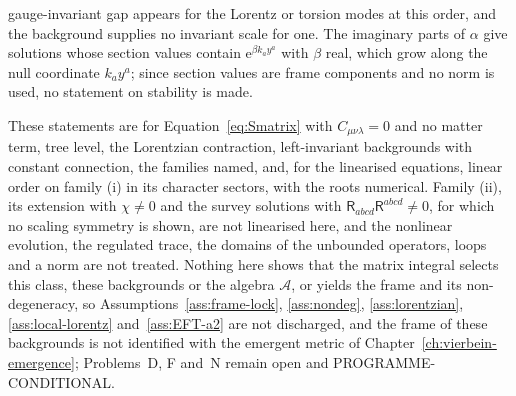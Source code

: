 gauge-invariant gap appears for the Lorentz or torsion modes at this order, and the background supplies no invariant scale for one. The imaginary parts of \(\alpha\) give solutions whose section values contain \(\mathrm e^{\beta k_ay^a}\) with \(\beta\) real, which grow along the null coordinate \(k_ay^a\); since section values are frame components and no norm is used, no statement on stability is made.

These statements are for Equation~\eqref{eq:Smatrix} with \(C_{\mu\nu\lambda}=0\) and no matter term, tree level, the Lorentzian contraction, left-invariant backgrounds with constant connection, the families named, and, for the linearised equations, linear order on family (i) in its character sectors, with the roots numerical. Family (ii), its extension with \(\chi\neq0\) and the survey solutions with \(\mathsf R_{abcd}\mathsf R^{abcd}\neq0\), for which no scaling symmetry is shown, are not linearised here, and the nonlinear evolution, the regulated trace, the domains of the unbounded operators, loops and a norm are not treated. Nothing here shows that the matrix integral selects this class, these backgrounds or the algebra \(\mathcal A\), or yields the frame and its non-degeneracy, so Assumptions~\ref{ass:frame-lock}, \ref{ass:nondeg}, \ref{ass:lorentzian}, \ref{ass:local-lorentz} and~\ref{ass:EFT-a2} are not discharged, and the frame of these backgrounds is not identified with the emergent metric of Chapter~\ref{ch:vierbein-emergence}; Problems~D, F and~N remain open and PROGRAMME-CONDITIONAL.
